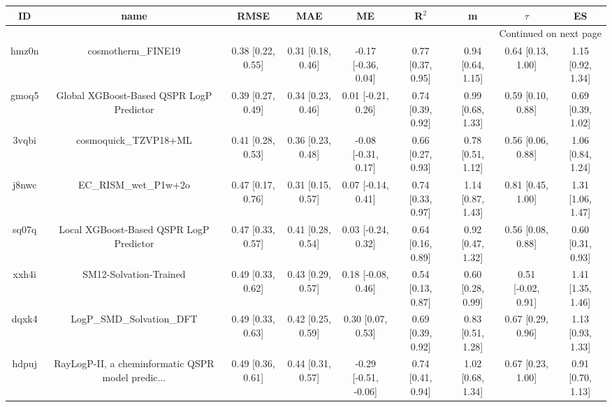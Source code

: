 \documentclass{article}
\begin{document}
\begin{center}
\scriptsize
\begin{longtable}{|ccccccccc|}
\toprule
    ID &                                               name &               RMSE &                MAE &                    ME &              R$^2$ &                    m &               $\tau$ &                    ES \\
\midrule
\endhead
\midrule
\multicolumn{9}{r}{{Continued on next page}} \\
\midrule
\endfoot

\bottomrule
\endlastfoot
 hmz0n &                                 cosmotherm\_FINE19 &  0.38 [0.22, 0.55] &  0.31 [0.18, 0.46] &   -0.17 [-0.36, 0.04] &  0.77 [0.37, 0.95] &    0.94 [0.64, 1.15] &    0.64 [0.13, 1.00] &     1.15 [0.92, 1.34] \\
 gmoq5 &           Global XGBoost-Based QSPR LogP Predictor &  0.39 [0.27, 0.49] &  0.34 [0.23, 0.46] &    0.01 [-0.21, 0.26] &  0.74 [0.39, 0.92] &    0.99 [0.68, 1.33] &    0.59 [0.10, 0.88] &     0.69 [0.39, 1.02] \\
 3vqbi &                              cosmoquick\_TZVP18+ML &  0.41 [0.28, 0.53] &  0.36 [0.23, 0.48] &   -0.08 [-0.31, 0.17] &  0.66 [0.27, 0.93] &    0.78 [0.51, 1.12] &    0.56 [0.06, 0.88] &     1.06 [0.84, 1.24] \\
 j8nwc &                              EC\_RISM\_wet\_P1w+2o &  0.47 [0.17, 0.76] &  0.31 [0.15, 0.57] &    0.07 [-0.14, 0.41] &  0.74 [0.33, 0.97] &    1.14 [0.87, 1.43] &    0.81 [0.45, 1.00] &     1.31 [1.06, 1.47] \\
 sq07q &            Local XGBoost-Based QSPR LogP Predictor &  0.47 [0.33, 0.57] &  0.41 [0.28, 0.54] &    0.03 [-0.24, 0.32] &  0.64 [0.16, 0.89] &    0.92 [0.47, 1.32] &    0.56 [0.08, 0.88] &     0.60 [0.31, 0.93] \\
 xxh4i &                             SM12-Solvation-Trained &  0.49 [0.33, 0.62] &  0.43 [0.29, 0.57] &    0.18 [-0.08, 0.46] &  0.54 [0.13, 0.87] &    0.60 [0.28, 0.99] &   0.51 [-0.02, 0.91] &     1.41 [1.35, 1.46] \\
 dqxk4 &                          LogP\_SMD\_Solvation\_DFT &  0.49 [0.33, 0.63] &  0.42 [0.25, 0.59] &     0.30 [0.07, 0.53] &  0.69 [0.39, 0.92] &    0.83 [0.51, 1.28] &    0.67 [0.29, 0.96] &     1.13 [0.93, 1.33] \\
 hdpuj &  RayLogP-II, a cheminformatic QSPR model predic... &  0.49 [0.36, 0.61] &  0.44 [0.31, 0.57] &  -0.29 [-0.51, -0.06] &  0.74 [0.41, 0.94] &    1.02 [0.68, 1.34] &    0.67 [0.23, 1.00] &     0.91 [0.70, 1.13] \\

\end{longtable}
\end{center}
\end{document}
